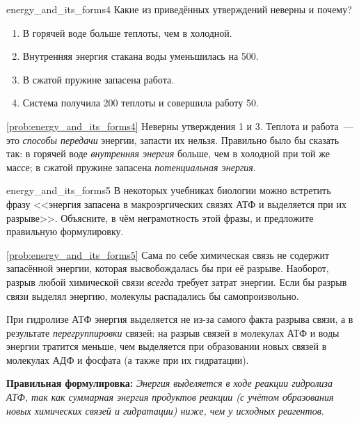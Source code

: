 \begin{problem}{}{energy_and_its_forms4}
    Какие из приведённых утверждений неверны и почему?
    \begin{enumerate}[label=\arabic*)]
        \item В горячей воде больше теплоты, чем в холодной.
        \item Внутренняя энергия стакана воды уменьшилась на \qty{500}{\ruJ}.
        \item В сжатой пружине запасена работа.
        \item Система получила \qty{200}{\ruJ} теплоты и совершила работу \qty{50}{\ruJ}.
    \end{enumerate}
    \begin{sol}{\ref{prob:energy_and_its_forms4}}
        Неверны утверждения 1 и 3. Теплота и работа~--- это \emph{способы передачи} энергии, запасти их нельзя. Правильно было бы сказать так: в горячей воде \emph{внутренняя энергия} больше, чем в холодной при той же массе; в сжатой пружине запасена \emph{потенциальная энергия}.
    \end{sol}
\end{problem}

\begin{problem}{}{energy_and_its_forms5}
    В некоторых учебниках биологии можно встретить фразу <<энергия запасена в макроэргических связях АТФ и выделяется при их разрыве>>. Объясните, в чём неграмотность этой фразы, и предложите правильную формулировку.
    \begin{sol}{\ref{prob:energy_and_its_forms5}}
        Сама по себе химическая связь не содержит запасённой энергии, которая высвобождалась бы при её разрыве. Наоборот, разрыв любой химической связи \emph{всегда} требует затрат энергии. Если бы разрыв связи выделял энергию, молекулы распадались бы самопроизвольно.

        При гидролизе АТФ энергия выделяется не из-за самого факта разрыва связи, а в результате \emph{перегруппировки} связей: на разрыв связей в молекулах АТФ и воды энергии тратится меньше, чем выделяется при образовании новых связей в молекулах АДФ и фосфата (а также при их гидратации).

        \textbf{Правильная формулировка:} \textit{Энергия выделяется в ходе реакции гидролиза АТФ, так как суммарная энергия продуктов реакции (с учётом образования новых химических связей и гидратации) ниже, чем у исходных реагентов}.
    \end{sol}
\end{problem}

